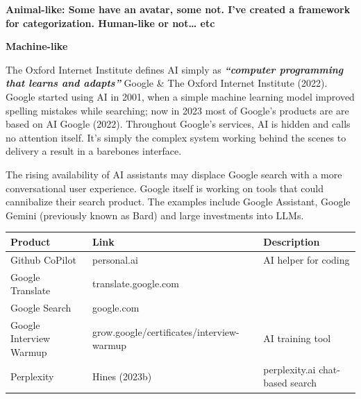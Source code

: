 \documentclass[
  letterpaper,
  DIV=11,
  numbers=noendperiod]{scrartcl}
\begin{document}
\textbf{Animal-like: Some have an avatar, some not. I've created a
framework for categorization. Human-like or not\ldots{} etc}

\textbf{Machine-like}

The Oxford Internet Institute defines AI simply as
\textbf{\emph{``computer programming that learns and adapts''}} Google
\& The Oxford Internet Institute (2022). Google started using AI in
2001, when a simple machine learning model improved spelling mistakes
while searching; now in 2023 most of Google's products are are based on
AI Google (2022). Throughout Google's services, AI is hidden and calls
no attention itself. It's simply the complex system working behind the
scenes to delivery a result in a barebones interface.

The rising availability of AI assistants may displace Google search with
a more conversational user experience. Google itself is working on tools
that could cannibalize their search product. The examples include Google
Assistant, Google Gemini (previously known as Bard) and large
investments into LLMs.

\begin{longtable}[]{@{}
  >{\raggedright\arraybackslash}p{}
  >{\raggedright\arraybackslash}p{}
  >{\raggedright\arraybackslash}p{}@{}}
\toprule\noalign{}
\begin{minipage}[b]{\linewidth}\raggedright
Product
\end{minipage} & \begin{minipage}[b]{\linewidth}\raggedright
Link
\end{minipage} & \begin{minipage}[b]{\linewidth}\raggedright
Description
\end{minipage} \\
\midrule\noalign{}
\endhead
\bottomrule\noalign{}
\endlastfoot
Github CoPilot & personal.ai & AI helper for coding \\
Google Translate & translate.google.com & \\
Google Search & google.com & \\
Google Interview Warmup & grow.google/certificates/interview-warmup & AI
training tool \\
Perplexity & Hines (2023b) & perplexity.ai chat-based search \\
\end{longtable}
\end{document}
